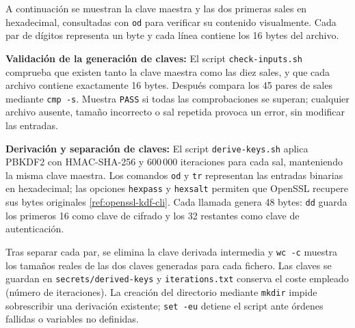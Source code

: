 \begingroup
\renewcommand{\lstlistingname}{Salida y verificación}

\endgroup

A continuación se muestran la clave maestra y las dos primeras sales en hexadecimal, consultadas con \texttt{od} para verificar su contenido visualmente.
Cada par de dígitos representa un byte y cada línea contiene los 16 bytes del archivo.

\begingroup
{}

\endgroup

\textbf{Validación de la generación de claves:} El script \texttt{check-inputs.sh} comprueba que existen tanto la clave maestra como las diez sales, y que cada archivo contiene exactamente 16 bytes.
Después compara los 45 pares de sales mediante \texttt{cmp -s}. Muestra \texttt{PASS} si todas las comprobaciones se superan; cualquier archivo ausente, tamaño incorrecto o sal repetida provoca un error, sin modificar las entradas.

\begingroup
\renewcommand{\lstlistingname}{Script}

\endgroup

\textbf{Derivación y separación de claves:} El script \texttt{derive-keys.sh} aplica PBKDF2 con HMAC-SHA-256 y 600\,000 iteraciones para cada sal, manteniendo la misma clave maestra.
Los comandos \texttt{od} y \texttt{tr} representan las entradas binarias en hexadecimal; las opciones \texttt{hexpass} y \texttt{hexsalt} permiten que OpenSSL recupere sus bytes originales \ref{ref:openssl-kdf-cli}.
Cada llamada genera 48 bytes: \texttt{dd} guarda los primeros 16 como clave de cifrado y los 32 restantes como clave de autenticación.

Tras separar cada par, se elimina la clave derivada intermedia y \texttt{wc -c} muestra los tamaños reales de las dos claves generadas para cada fichero.
Las claves se guardan en \texttt{secrets/derived-keys} y \texttt{iterations.txt} conserva el coste empleado (número de iteraciones).
La creación del directorio mediante \texttt{mkdir} impide sobrescribir una derivación existente; \texttt{set -eu} detiene el script ante órdenes fallidas o variables no definidas.

